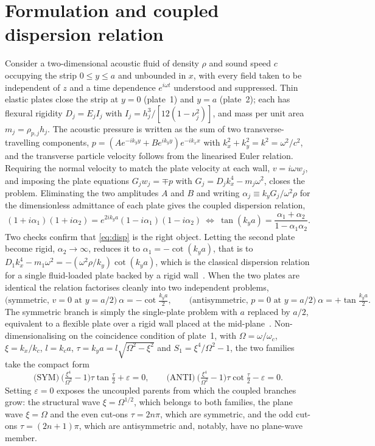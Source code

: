 \documentclass[11pt]{article}
\newcommand{\Om}{\Omega}
\newcommand{\eps}{\varepsilon}
\begin{document}
\section{Formulation and coupled dispersion relation}
Consider a two-dimensional acoustic fluid of density $\rho$ and sound speed $c$ occupying the strip
$0\le y\le a$ and unbounded in $x$, with every field taken to be independent of $z$ and a time
dependence $e^{i\omega t}$ understood and suppressed. Thin elastic plates close the strip at $y=0$
(plate~1) and $y=a$ (plate~2); each has flexural rigidity $D_j=E_jI_j$ with
$I_j=h_j^3/[12(1-\nu_j^2)]$, and mass per unit area $m_j=\rho_{p,j}h_j$. The acoustic pressure is written
as the sum of two transverse-travelling components,
$p=(A e^{-ik_yy}+Be^{ik_yy})e^{-ik_xx}$ with $k_x^2+k_y^2=k^2=\omega^2/c^2$, and the transverse particle
velocity follows from the linearised Euler relation. Requiring the normal velocity to match the plate
velocity at each wall, $v=i\omega w_j$, and imposing the plate equations $G_jw_j=\mp p$ with
$G_j=D_jk_x^4-m_j\omega^2$, closes the problem. Eliminating the two amplitudes $A$ and $B$ and writing
$\alpha_j\equiv k_yG_j/\omega^2\rho$ for the dimensionless admittance of each plate gives the coupled
dispersion relation,
\begin{equation}
(1+i\alpha_1)(1+i\alpha_2)=e^{2ik_ya}(1-i\alpha_1)(1-i\alpha_2)
\ \Longleftrightarrow\
\tan(k_ya)=\frac{\alpha_1+\alpha_2}{1-\alpha_1\alpha_2}.
\label{eq:disp}
\end{equation}
Two checks confirm that \eqref{eq:disp} is the right object. Letting the second plate become rigid,
$\alpha_2\to\infty$, reduces it to $\alpha_1=-\cot(k_ya)$, that is to
$D_1k_x^4-m_1\omega^2=-(\omega^2\rho/k_y)\cot(k_ya)$, which is the classical dispersion relation for a
single fluid-loaded plate backed by a rigid wall~\cite{sarkarsonti}. When
the two plates are identical the relation factorises cleanly into two independent problems,
\begin{equation}
\text{(symmetric, $v{=}0$ at $y{=}a/2$)}\ \alpha=-\cot\tfrac{k_ya}{2},
\qquad
\text{(antisymmetric, $p{=}0$ at $y{=}a/2$)}\ \alpha=+\tan\tfrac{k_ya}{2}.
\end{equation}
The symmetric branch is simply the single-plate problem with $a$ replaced by $a/2$, equivalent to a
flexible plate over a rigid wall placed at the mid-plane~\cite{fahy}. Non-dimensionalising on the coincidence condition of plate~1, with
$\Om=\omega/\omega_c$, $\xi=k_x/k_c$, $l=k_ca$, $\tau=k_ya=l\sqrt{\Om^2-\xi^2}$ and
$S_1=\xi^4/\Om^2-1$, the two families take the compact form
\begin{equation}
\text{(SYM)}\ \Big(\tfrac{\xi^4}{\Om^2}-1\Big)\tau\tan\tfrac{\tau}{2}+\eps=0,
\qquad
\text{(ANTI)}\ \Big(\tfrac{\xi^4}{\Om^2}-1\Big)\tau\cot\tfrac{\tau}{2}-\eps=0.
\label{eq:nd}
\end{equation}
Setting $\eps=0$ exposes the uncoupled parents from which the coupled branches grow: the structural wave
$\xi=\Om^{1/2}$, which belongs to both families, the plane wave $\xi=\Om$ and the even cut-ons
$\tau=2n\pi$, which are symmetric, and the odd cut-ons $\tau=(2n{+}1)\pi$, which are antisymmetric and,
notably, have no plane-wave member.
\end{document}
